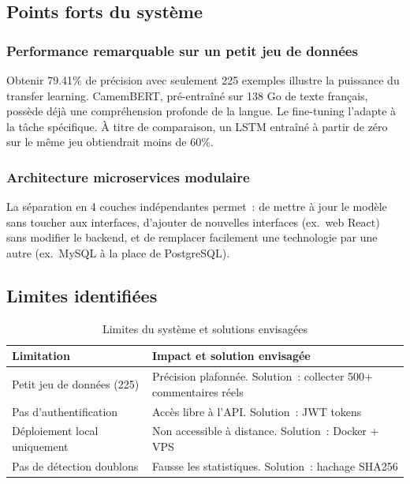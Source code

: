 \documentclass[12pt,a4paper,oneside]{report}
\begin{document}
\subsection{Points forts du système}

\subsubsection{Performance remarquable sur un petit jeu de données}

Obtenir 79.41\% de précision avec seulement 225 exemples illustre la puissance
du transfer learning. CamemBERT, pré-entraîné sur 138 Go de texte français,
possède déjà une compréhension profonde de la langue. Le fine-tuning l'adapte
à la tâche spécifique. À titre de comparaison, un LSTM entraîné à partir de
zéro sur le même jeu obtiendrait moins de 60\%.

\subsubsection{Architecture microservices modulaire}

La séparation en 4 couches indépendantes permet~: de mettre à jour le modèle
sans toucher aux interfaces, d'ajouter de nouvelles interfaces (ex.\ web React)
sans modifier le backend, et de remplacer facilement une technologie par une
autre (ex.\ MySQL à la place de PostgreSQL).

\subsection{Limites identifiées}

\begin{table}[H]
\centering
\caption{Limites du système et solutions envisagées}
\label{tab:limites}
\renewcommand{\arraystretch}{1.4}
\begin{tabular}{p{4cm} p{8.5cm}}
\toprule
\rowcolor{bleuprincipal!15}
\textbf{Limitation} & \textbf{Impact et solution envisagée} \\
\midrule
Petit jeu de données (225) & Précision plafonnée. Solution~: collecter 500+ commentaires réels \\
\rowcolor{gray!8}
Pas d'authentification & Accès libre à l'API. Solution~: JWT tokens \\
Déploiement local uniquement & Non accessible à distance. Solution~: Docker + VPS \\
\rowcolor{gray!8}
Pas de détection doublons & Fausse les statistiques. Solution~: hachage SHA256 \\
\bottomrule
\end{tabular}
\end{table}
\end{document}
